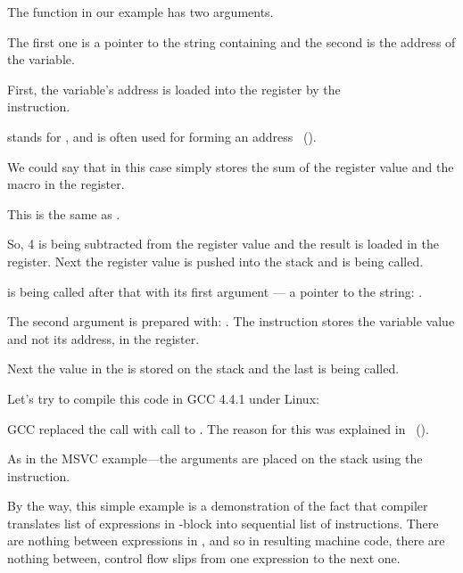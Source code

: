 The \scanf function in our example has two arguments.

The first one is a pointer to the string containing  and the second is the address of the  variable.

First, the  variable's address is loaded into the \EAX register by the \\
 instruction.

\LEA stands for , and is often used for forming an address ~().

We could say that in this case \LEA simply stores the sum of the \EBP register value and the  macro in the \EAX register.

This is the same as .

So, 4 is being subtracted from the \EBP register value and the result is loaded in the \EAX register.
Next the \EAX register value is pushed into the stack and \scanf is being called.

\printf is being called after that with its first argument --- a pointer to the string:
.

The second argument is prepared with: .
The instruction stores the  variable value and not its address, in the \ECX register.

Next the value in the \ECX is stored on the stack and the last \printf is being called.




Let's try to compile this code in GCC 4.4.1 under Linux:



GCC replaced the \printf call with call to \puts. The reason for this was explained in ~().

% 

As in the MSVC example---the arguments are placed on the stack using the \MOV instruction.


By the way, this simple example is a demonstration of the fact that compiler translates
list of expressions in \CCpp-block into sequential list of instructions.
There are nothing between expressions in \CCpp, and so in resulting machine code, 
there are nothing between, control flow slips from one expression to the next one.

